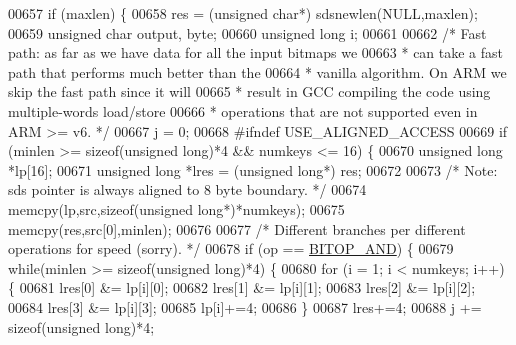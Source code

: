 \begin{DoxyCode}
{00657     \textcolor{keywordflow}{if} (maxlen) \{
00658         res = (\textcolor{keywordtype}{unsigned} \textcolor{keywordtype}{char}*) sdsnewlen(NULL,maxlen);
00659         \textcolor{keywordtype}{unsigned} \textcolor{keywordtype}{char} output, byte;
00660         \textcolor{keywordtype}{unsigned} \textcolor{keywordtype}{long} i;
00661 
00662         \textcolor{comment}{/* Fast path: as far as we have data for all the input bitmaps we}
00663 \textcolor{comment}{         * can take a fast path that performs much better than the}
00664 \textcolor{comment}{         * vanilla algorithm. On ARM we skip the fast path since it will}
00665 \textcolor{comment}{         * result in GCC compiling the code using multiple-words load/store}
00666 \textcolor{comment}{         * operations that are not supported even in ARM >= v6. */}
00667         j = 0;
00668         \textcolor{preprocessor}{#}\textcolor{preprocessor}{ifndef} \textcolor{preprocessor}{USE\_ALIGNED\_ACCESS}
00669         \textcolor{keywordflow}{if} (minlen >= \textcolor{keyword}{sizeof}(\textcolor{keywordtype}{unsigned} \textcolor{keywordtype}{long})*4 && numkeys <= 16) \{
00670             \textcolor{keywordtype}{unsigned} \textcolor{keywordtype}{long} *lp[16];
00671             \textcolor{keywordtype}{unsigned} \textcolor{keywordtype}{long} *lres = (\textcolor{keywordtype}{unsigned} \textcolor{keywordtype}{long}*) res;
00672 
00673             \textcolor{comment}{/* Note: sds pointer is always aligned to 8 byte boundary. */}
00674             memcpy(lp,src,\textcolor{keyword}{sizeof}(\textcolor{keywordtype}{unsigned} \textcolor{keywordtype}{long}*)*numkeys);
00675             memcpy(res,src[0],minlen);
00676 
00677             \textcolor{comment}{/* Different branches per different operations for speed (sorry). */}
00678             \textcolor{keywordflow}{if} (op == \hyperlink{bitops_8c_adb2b31ac9285af6d27408c81c4a1a637}{BITOP\_AND}) \{
00679                 \textcolor{keywordflow}{while}(minlen >= \textcolor{keyword}{sizeof}(\textcolor{keywordtype}{unsigned} \textcolor{keywordtype}{long})*4) \{
00680                     \textcolor{keywordflow}{for} (i = 1; i < numkeys; i++) \{
00681                         lres[0] &= lp[i][0];
00682                         lres[1] &= lp[i][1];
00683                         lres[2] &= lp[i][2];
00684                         lres[3] &= lp[i][3];
00685                         lp[i]+=4;
00686                     \}
00687                     lres+=4;
00688                     j += \textcolor{keyword}{sizeof}(\textcolor{keywordtype}{unsigned} \textcolor{keywordtype}{long})*4;
}
\end{DoxyCode}

